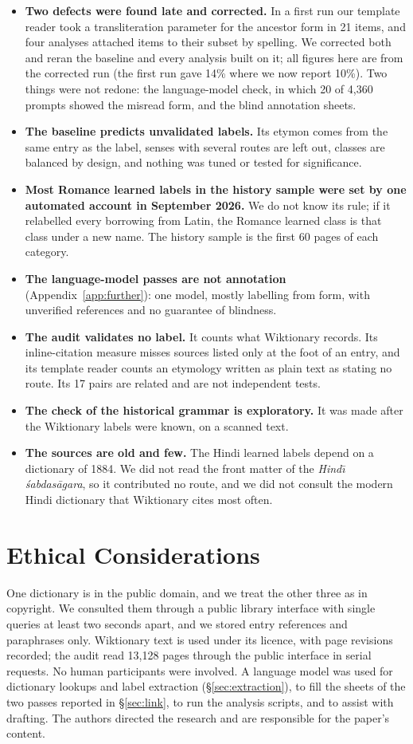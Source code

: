\documentclass[11pt]{article}
\begin{document}
\begin{itemize}
\item \textbf{Two defects were found late and corrected.} In a first run our template reader took a transliteration parameter for the ancestor form in 21 items, and four analyses attached items to their subset by spelling. We corrected both and reran the baseline and every analysis built on it; all figures here are from the corrected run (the first run gave 14\% where we now report 10\%). Two things were not redone: the language-model check, in which 20 of 4,360 prompts showed the misread form, and the blind annotation sheets.
\item \textbf{The baseline predicts unvalidated labels.} Its etymon comes from the same entry as the label, senses with several routes are left out, classes are balanced by design, and nothing was tuned or tested for significance.
\item \textbf{Most Romance learned labels in the history sample were set by one automated account in September 2026.} We do not know its rule; if it relabelled every borrowing from Latin, the Romance learned class is that class under a new name. The history sample is the first 60 pages of each category.
\item \textbf{The language-model passes are not annotation} (Appendix~\ref{app:further}): one model, mostly labelling from form, with unverified references and no guarantee of blindness.
\item \textbf{The audit validates no label.} It counts what Wiktionary records. Its inline-citation measure misses sources listed only at the foot of an entry, and its template reader counts an etymology written as plain text as stating no route. Its 17 pairs are related and are not independent tests.
\item \textbf{The check of the historical grammar is exploratory.} It was made after the Wiktionary labels were known, on a scanned text.
\item \textbf{The sources are old and few.} The Hindi learned labels depend on a dictionary of 1884. We did not read the front matter of the \textit{Hind\=\i{} \'sabdas\=agara}, so it contributed no route, and we did not consult the modern Hindi dictionary that Wiktionary cites most often.
\end{itemize}

\section*{Ethical Considerations}

One dictionary is in the public domain, and we treat the other three as in copyright. We consulted them through a public library interface with single queries at least two seconds apart, and we stored entry references and paraphrases only. Wiktionary text is used under its licence, with page revisions recorded; the audit read 13,128 pages through the public interface in serial requests. No human participants were involved. A language model was used for dictionary lookups and label extraction (\S\ref{sec:extraction}), to fill the sheets of the two passes reported in \S\ref{sec:link}, to run the analysis scripts, and to assist with drafting. The authors directed the research and are responsible for the paper's content.
\end{document}
